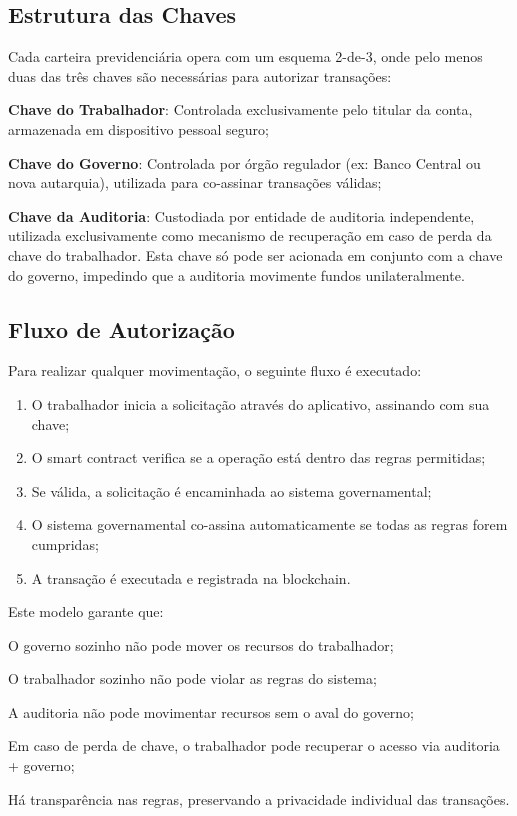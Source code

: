\subsection{Estrutura das Chaves}

Cada carteira previdenciária opera com um esquema 2-de-3, onde pelo menos duas das três chaves são necessárias para autorizar transações:

\begin{alineas}
    \item \textbf{Chave do Trabalhador}: Controlada exclusivamente pelo titular da conta, armazenada em dispositivo pessoal seguro;
    \item \textbf{Chave do Governo}: Controlada por órgão regulador (ex: Banco Central ou nova autarquia), utilizada para co-assinar transações válidas;
    \item \textbf{Chave da Auditoria}: Custodiada por entidade de auditoria independente, utilizada exclusivamente como mecanismo de recuperação em caso de perda da chave do trabalhador. Esta chave só pode ser acionada em conjunto com a chave do governo, impedindo que a auditoria movimente fundos unilateralmente.
\end{alineas}

\subsection{Fluxo de Autorização}

Para realizar qualquer movimentação, o seguinte fluxo é executado:

\begin{enumerate}
    \item O trabalhador inicia a solicitação através do aplicativo, assinando com sua chave;
    \item O smart contract verifica se a operação está dentro das regras permitidas;
    \item Se válida, a solicitação é encaminhada ao sistema governamental;
    \item O sistema governamental co-assina automaticamente se todas as regras forem cumpridas;
    \item A transação é executada e registrada na blockchain.
\end{enumerate}

Este modelo garante que:
\begin{alineas}
    \item O governo sozinho não pode mover os recursos do trabalhador;
    \item O trabalhador sozinho não pode violar as regras do sistema;
    \item A auditoria não pode movimentar recursos sem o aval do governo;
    \item Em caso de perda de chave, o trabalhador pode recuperar o acesso via auditoria + governo;
    \item Há transparência nas regras, preservando a privacidade individual das transações.
\end{alineas}

